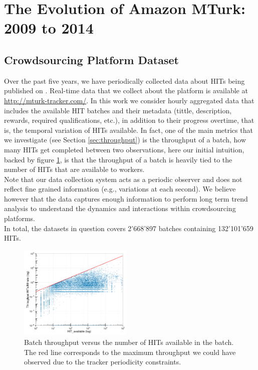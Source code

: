 \section{The Evolution of Amazon MTurk: 2009 to 2014}\label{sec:stats}


\subsection{Crowdsourcing Platform Dataset}
\label{sec:tracker}
Over the past five years, we have periodically collected data about HITs being published on \amt{}.
Real-time data that we collect about the platform is available at \url{http://mturk-tracker.com/}. In this work we consider hourly aggregated data that includes the available HIT batches and their metadata (tittle, description, rewards, required qualifications, etc.), in addition to their progress overtime, that is, the temporal variation of HITs available. In fact, one of the main metrics that we investigate (see Section \ref{sec:throughput}) is the throughput of a batch, how many HITs  get completed between two observations, here our initial intuition, backed by figure \ref{fig:motiv}, is that the throughput of a batch is heavily tied to the number of HITs that are available to workers.\\
Note that our data collection system acts  as a periodic observer and does not reflect fine grained information (e.g., variations at each second). We believe however that the data captures enough information to perform long term trend analysis to understand the dynamics and interactions within crowdsourcing platforms.\\

In total, the datasets in question covers 2'668'897 batches containing 132'101'659 HITs.

\begin{figure}[tb]
	\centering
		\includegraphics[width=0.48\textwidth]{figures/motiv_mturk}
	\caption{Batch throughput versus the number of HITs available in the batch. The red line corresponds to the maximum throughput we could have observed due to the tracker periodicity constraints.\protect\footnotemark}
	\label{fig:motiv}
\end{figure}

